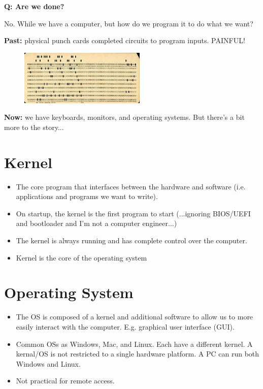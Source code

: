 \documentclass[12pt]{article}
\numberwithin{equation}{section}
\begin{document}
\textbf{Q: Are we done?}

No. While we have a computer, but how do we program it to do what we want?

\textbf{Past: }physical punch cards completed circuits to program inputs. PAINFUL!

\begin{figure}[H]
	\centering
	\includegraphics[width=6cm] {punch}
\end{figure}

\textbf{Now: }we have keyboards, monitors, and operating systems. But there's a bit more to the story...

\section{Kernel}
\begin{itemize}
    \item The core program that interfaces between the hardware and software (i.e. applications and programs we want to write).
    \item On startup, the kernel is the first program to start (...ignoring BIOS/UEFI and bootloader and I'm not a computer engineer...)
    \item The kernel is always running and has complete control over the computer.
    \item Kernel is the core of the operating system
\end{itemize}

\section{Operating System}
\begin{itemize}
    \item The OS is composed of a kernel and additional software to allow us to more easily interact with the computer. E.g. graphical user interface (GUI).
    \item Common OSs as Windows, Mac, and Linux. Each have a different kernel. A kernal/OS is not restricted to a single hardware platform. A PC can run both Windows and Linux.
    \item Not practical for remote access. 
\end{itemize}
\end{document}
